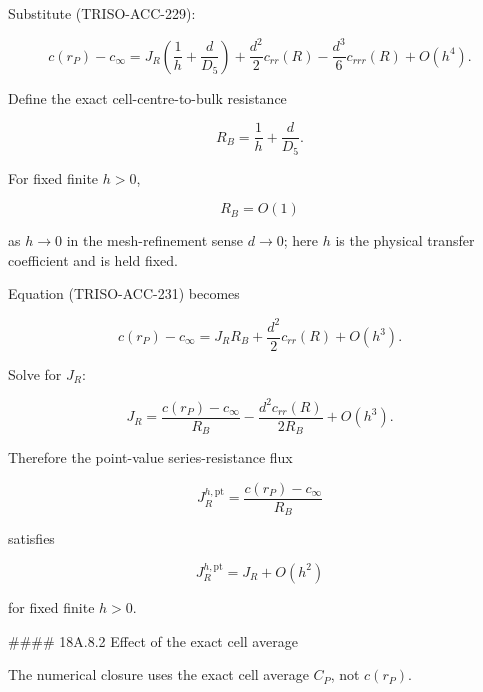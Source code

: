 \documentclass[11pt,a4paper]{article}
\begin{document}
Substitute (TRISO-ACC-229):

\begin{equation}
c(r_P)-c_\infty
=
J_R
\left(
\frac1h+\frac d{D_5}
\right)
+
\frac{d^2}{2}c_{rr}(R)
-
\frac{d^3}{6}c_{rrr}(R)
+
O(h^4).
\tag{TRISO-ACC-231}
\label{eq:triso-acc-231}
\end{equation}

Define the exact cell-centre-to-bulk resistance

\begin{equation}
R_B
=
\frac1h+\frac d{D_5}.
\tag{TRISO-ACC-232}
\label{eq:triso-acc-232}
\end{equation}

For fixed finite $h>0$,

\begin{equation}
R_B=O(1)
\tag{TRISO-ACC-233}
\label{eq:triso-acc-233}
\end{equation}

as $h\to0$ in the mesh-refinement sense $d\to0$; here $h$ is the physical transfer coefficient and is held fixed.

Equation (TRISO-ACC-231) becomes

\begin{equation}
c(r_P)-c_\infty
=
J_RR_B
+
\frac{d^2}{2}c_{rr}(R)
+
O(h^3).
\tag{TRISO-ACC-234}
\label{eq:triso-acc-234}
\end{equation}

Solve for $J_R$:

\begin{equation}
J_R
=
\frac{
c(r_P)-c_\infty
}{
R_B
}
-
\frac{
d^2c_{rr}(R)
}{
2R_B
}
+
O(h^3).
\tag{TRISO-ACC-235}
\label{eq:triso-acc-235}
\end{equation}

Therefore the point-value series-resistance flux

\begin{equation}
J_R^{h,\mathrm{pt}}
=
\frac{
c(r_P)-c_\infty
}{
R_B
}
\tag{TRISO-ACC-236}
\label{eq:triso-acc-236}
\end{equation}

satisfies

\begin{equation}
\boxed{
J_R^{h,\mathrm{pt}}
=
J_R+O(h^2)
}
\tag{TRISO-ACC-237}
\label{eq:triso-acc-237}
\end{equation}

for fixed finite $h>0$.

\#\#\#\# 18A.8.2 Effect of the exact cell average

The numerical closure uses the exact cell average $C_P$, not $c(r_P)$.
\end{document}
